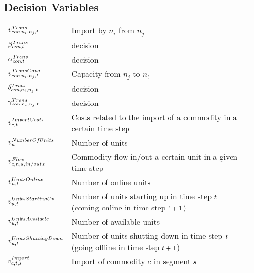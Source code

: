 \subsection*{Decision Variables}
\vspace{-1em}
	\begin{longtable}{p{\cola} p{\colc} >{\small\raggedleft\arraybackslash\itshape}p{\colb}}
		$v^{Trans}_{{con},n_i,n_j,t}        $	& Import by $n_i$ from $n_j$                                  	&                \\
		$\beta^{Trans}_{{con},t}            $	& decision                                                    	&                \\
		$\alpha^{Trans}_{{con},t}            $	& decision                                                    	&                \\
		$v^{TransCapa}_{{con},n_i,n_j,t}     $	& Capacity from $n_j$ to $n_i$                                	&                \\
		$\delta^{Trans}_{{con},n_i,n_j,t}            $	& decision                                                    	&                \\
		$\gamma^{Trans}_{{con},n_i,n_j,t}            $	& decision                                                    	&                \\[0.5em]

		$v^{ImportCosts}_{c,t}  $	& Costs related to the import of a commodity in a certain time step	&                \\[0.5em]

		$v^{NumberOfUnits}_{u}$	& Number of units                                             	&                \\[0.5em]

		$v^{Flow}_{c,n, u,in/out,t}         $	& Commodity flow in/out a certain unit in a given time step   	&                \\
		$v^{UnitsOnline}_{u,t}  $	& Number of online units                                      	&                \\
		$v^{UnitsStartingUp}_{u,t}$	& Number of units starting up in time step $t$ (coming online in time step $t +1$)	&                \\
		$v^{UnitsAvailable}_{u,t}$	& Number of available units                                   	&                \\
		$v^{UnitsShuttingDown}_{u,t}$	& Number of units shutting down in time step $t$ (going offline in time step $t +1$)	&                \\
		$v^{Import}_{c,t,s}       $	& Import of commodity $c$ in segment $s$      	&                \\
	\end{longtable}

